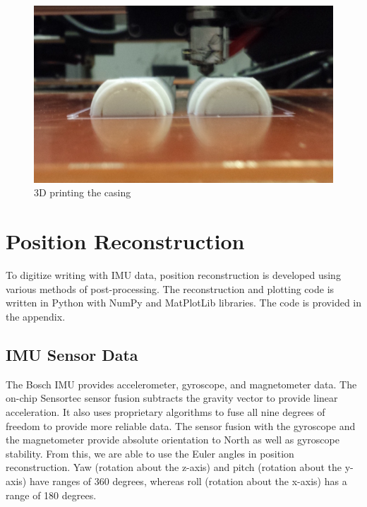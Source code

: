 \documentclass[12pt,journal]{IEEEtran}
\begin{document}
\begin{figure}[h]
    \includegraphics[width=0.6\linewidth]{figures/3d-print}
  \caption{3D printing the casing}
  \label{fig:3d-print}
\end{figure}

\section{Position Reconstruction}
To digitize writing with IMU data, position reconstruction is developed using various methods of post-processing. The reconstruction and plotting code is written in Python with NumPy and MatPlotLib libraries. The code is provided in the appendix.

\subsection{IMU Sensor Data}
	The Bosch IMU provides accelerometer, gyroscope, and magnetometer data. The on-chip Sensortec sensor fusion subtracts the gravity vector to provide linear acceleration. It also uses proprietary algorithms to fuse all nine degrees of freedom to provide more reliable data. The sensor fusion with the gyroscope and the magnetometer provide absolute orientation to North as well as gyroscope stability. From this, we are able to use the Euler angles in position reconstruction. Yaw (rotation about the z-axis) and pitch (rotation about the y-axis) have ranges of 360 degrees, whereas roll (rotation about the x-axis) has a range of 180 degrees.
\end{document}
